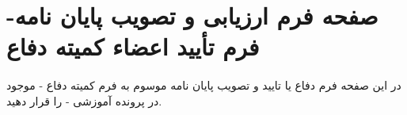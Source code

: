 
\thispagestyle{empty}

\section*{صفحه فرم ارزیابی و تصویب پایان نامه- فرم تأیید اعضاء كميته دفاع}

\paragraph*{}
   در این صفحه فرم دفاع یا تایید و تصویب پایان نامه موسوم به فرم کمیته دفاع - موجود در پرونده آموزشی - را قرار دهید. 
